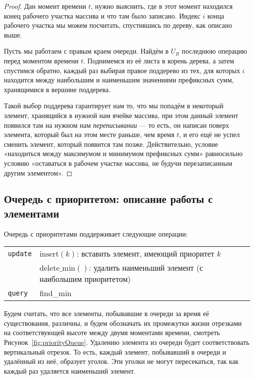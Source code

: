 \begin{proof}
	Дан момент времени $t$, нужно выяснить, где в этот момент находился конец рабочего участка массива и что там было записано. Индекс $i$ конца рабочего участка мы можем посчитать, спустившись по дереву, как описано выше.

	Пусть мы работаем с правым краем очереди. Найдём в $U_R$ последнюю операцию перед моментом времени $t$. Поднимемся из её листа в корень дерева, а затем спустимся обратно, каждый раз выбирая правое поддерево из тех, для которых $i$ находится между наибольшим и наименьшим значениями префиксных сумм, хранящимися в вершине поддерева.

	Такой выбор поддерева гарантирует нам то, что мы попадём в некоторый элемент, хранящийся в нужной нам ячейке массива, при этом данный элемент появился там на нужном нам {\it переписывании} — то есть, он написан поверх элемента, который был на этом месте раньше, чем время $t$, и его ещё не успел сменить элемент, который появится там позже. Действительно, условие «находиться между максимумом и минимумом префиксных сумм» равносильно условию «оставаться в рабочем участке массива, не будучи перезаписанным другим элементом».
\end{proof}

\subsection{Очередь с приоритетом: описание работы с элементами}
\newcommand{\qnow}{$Q_{\text{now}}$\xspace}

Очередь с приоритетами поддерживает следующие операции:

\begin{center} \begin{tabular}{ll}
	{\tt update} & $\text{insert} (k)$: вставить элемент, имеющий приоритет $k$ \\
		& $\text{delete\_min} ()$: удалить наименьший элемент (с наибольшим приоритетом) \\
	{\tt query} & find\_min
\end{tabular} \end{center}

Будем считать, что все элементы, побывавшие в очереди за время её существования, различны, и будем обозначать их промежутки жизни отрезками на соответствующей высоте между двумя моментами времени, смотреть Рисунок~\ref{fig:priorityQueue}. Удалению элемента из очереди будет соответствовать вертикальный отрезок. То есть, каждый элемент, побывавший в очереди и удалённый из неё, образует уголок. Эти уголки не могут пересекаться, так как каждый раз удаляется наименьший элемент.

